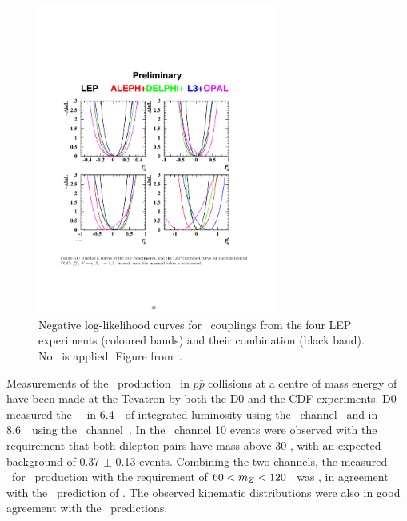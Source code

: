 \begin{figure}
\centering
        \includegraphics[width=0.7\textwidth]{lep_tgc}
    \caption[Negative log-likelihood curves for \TGC\ couplings from the four LEP
    experiments and their combination.]
    {Negative log-likelihood curves for \TGC\ couplings from the four LEP
    experiments (coloured bands) and their combination (black band). No
    \formfactor\ is applied. Figure from~\cite{bib:LEPEW2006}.}
    \label{fig:lep-tgc}
\end{figure}

Measurements of the \ZZ\ production \cx\ in $p \bar{p}$
collisions at a centre of mass energy of  have been made
at the Tevatron by both the D0 and the CDF experiments. D0 measured the \ZZ\ \cx\ in
6.4~\ifb\ of integrated luminosity using the \ZZllll\
channel~\cite{Abazov:2011td} and in 8.6~\ifb\ using the
\ZZllvv\ channel~\cite{Abazov:2012cj}. In the \ZZllll\ channel 10 events
were observed with the requirement that both dilepton pairs have mass above 30
\gev, with an expected background of 0.37 $\pm$ 0.13 events. Combining the two
channels, the measured \cx\ for \ZZ\ production with the requirement of $60 < m_{Z}
< 120$ \gev\ was 
, 
in agreement with the \sm\ prediction of \crossSec{p\bar p\ra ZZ}{1.3 \pm 0.1 \, \rm{pb}}. 
The observed kinematic distributions were
also in good agreement with the \sm\ predictions. 

